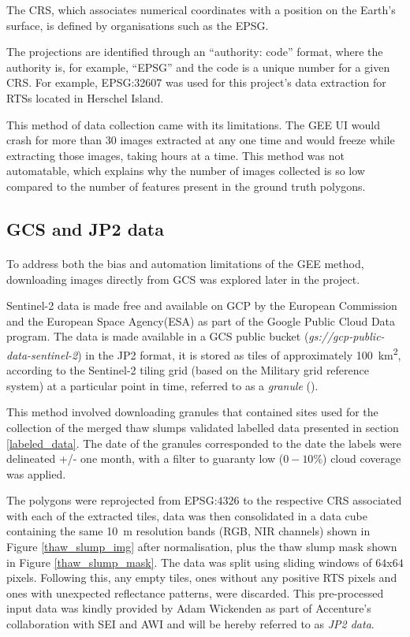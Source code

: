 The \gls{CRS}, which associates numerical coordinates with a position on the Earth's surface, is defined by organisations such as the \gls{EPSG}.

The projections are identified through an “authority: code” format, where the authority is, for example, “\gls{EPSG}” and the code is a unique number for a given \gls{CRS}. For example, \gls{EPSG}:32607 was used for this project's data extraction for \gls{RTS}s located in Herschel Island.

This method of data collection came with its limitations. The \gls{GEE} \gls{UI} would crash for more than 30 images extracted at any one time and would freeze while extracting those images, taking hours at a time. This method was not automatable, which explains why the number of images collected is so low compared to the number of features present in the ground truth polygons.

\subsection{\gls{GCS} and \gls{JP2} data}
\paragraph{}
To address both the bias and automation limitations of the \gls{GEE} method, downloading images directly from \gls{GCS} was explored later in the project.

Sentinel-2 data is made free and available on \gls{GCP} by the European Commission and the European Space Agency(ESA) as part of the Google Public Cloud Data program. The data is made available in a \gls{GCS} public bucket (\textit{gs://gcp-public-data-sentinel-2}) in the \gls{JP2} format, it is stored as tiles of approximately \SI{100}{\kilo\metre\squared}, according to the Sentinel-2 tiling grid (based on the Military grid reference system) at a particular point in time, referred to as a \textit{granule} (\cite{sentinel2_gcp}).

This method involved downloading granules that contained sites used for the collection of the merged thaw slumps validated labelled data presented in section \ref{labeled_data}. The date of the granules corresponded to the date the labels were delineated +/- one month, with a filter to guaranty low ($0-10\%$) cloud coverage was applied.

The polygons were reprojected from \gls{EPSG}:$4326$ to the respective \gls{CRS} associated with each of the extracted tiles, data was then consolidated in a data cube containing the same \SI{10}{\metre} resolution bands (\gls{RGB}, \gls{NIR} channels) shown in Figure \ref{thaw_slump_img} after normalisation, plus the thaw slump mask shown in Figure \ref{thaw_slump_mask}. The data was split using sliding windows of $64$x$64$ pixels. Following this, any empty tiles, ones without any positive \gls{RTS} pixels and ones with unexpected reflectance patterns, were discarded. This pre-processed input data was kindly provided by Adam Wickenden as part of Accenture's collaboration with \gls{SEI} and \gls{AWI} and will be hereby referred to as \textit{\gls{JP2} data}.

